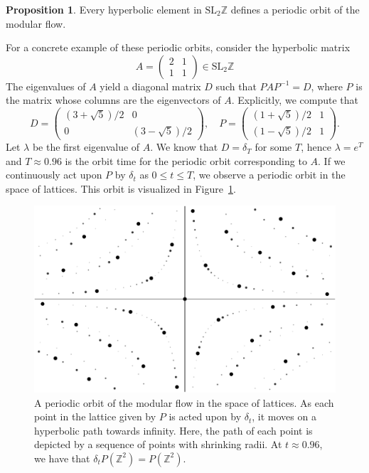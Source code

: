 \documentclass[12pt,twoside]{reedthesis}
\theoremstyle{definition}
\newtheorem{prop}[thm]{Proposition}
\newcommand{\Z}{\mathbb{Z}}
\newcommand{\SLZ}{\mathrm{SL}_2{\Z}}
\begin{document}
\begin{prop}\label{prop:hyperbolic_defines_flow}
  Every hyperbolic element in $\SLZ$ defines a periodic orbit of the modular flow.
\end{prop}

For a concrete example of these periodic orbits, consider the hyperbolic matrix
\begin{equation*}
  A = \begin{pmatrix}
    2 & 1 \\
    1 & 1
  \end{pmatrix}
  \in \SLZ
\end{equation*}
The eigenvalues of $A$ yield a diagonal matrix $D$ such that $PAP^{-1} = D$, where $P$ is the matrix whose columns are the eigenvectors of $A$.
Explicitly, we compute that
\begin{equation*}
  D = \begin{pmatrix}
    (3 + \sqrt{5}) / 2 & 0 \\
    0 & (3 - \sqrt{5}) / 2
  \end{pmatrix}, \quad P = \begin{pmatrix}
    (1 + \sqrt{5}) / 2 & 1 \\
    (1 - \sqrt{5}) / 2 & 1
  \end{pmatrix}.
\end{equation*}
Let $\lambda$ be the first eigenvalue of $A$.
We know that $D = \delta_T$ for some $T$, hence $\lambda = e^T$ and $T \approx 0.96$ is the orbit time for the periodic orbit corresponding to $A$.
If we continuously act upon $P$ by $\delta_t$ as $0 \leq t \leq T$, we observe a periodic orbit in the space of lattices.
This orbit is visualized in Figure~\ref{fig:periodic_orbits_lattice}.

\begin{figure}[h]
  \centering
  \includegraphics[width=0.8\linewidth]{figures/periodic_orbits_lattice.pdf}
  \caption{A periodic orbit of the modular flow in the space of lattices. As each point in the lattice given by $P$ is acted upon by $\delta_t$, it moves on a hyperbolic path towards infinity. Here, the path of each point is depicted by a sequence of points with shrinking radii. At $t \approx 0.96$, we have that $\delta_t P(\Z^2) = P(\Z^2)$.}
  \label{fig:periodic_orbits_lattice}
\end{figure}
\end{document}
